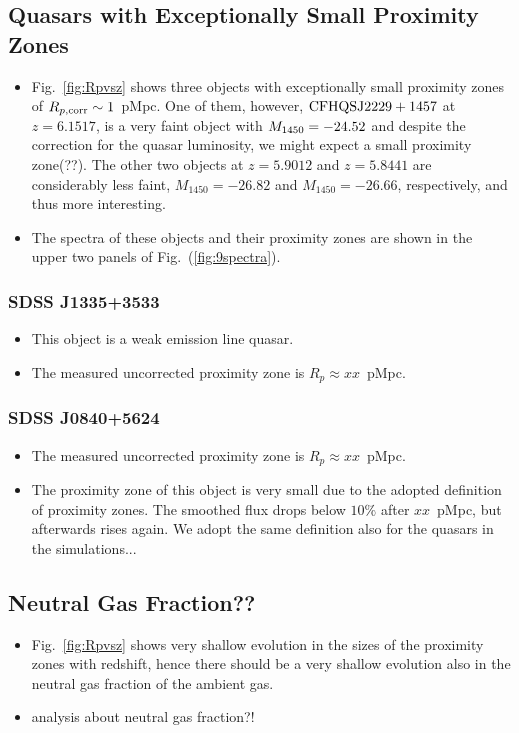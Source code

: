 \documentclass[iop]{emulateapj}
\begin{document}
\subsection{Quasars with Exceptionally Small Proximity Zones}\label{sec:small_zones}

\begin{itemize}
\item Fig.~\ref{fig:Rpvsz} shows three objects with exceptionally small proximity zones of $R_{p, \rm corr}\sim 1$~pMpc. One of them, however, $\rm CFHQS J2229+1457$ at $z=6.1517$, is a very faint object with $M_{\rm 1450}=-24.52$ and despite the correction for the quasar luminosity, we might expect a small proximity zone(??). The other two objects at $z=5.9012$ and $z=5.8441$ are considerably less faint, $M_{1450}=-26.82$ and $M_{1450}=-26.66$, respectively, and thus more interesting. 
\item The spectra of these objects and their proximity zones are shown in the upper two panels of Fig.~(\ref{fig:9spectra}).
\end{itemize}
 
\subsubsection*{SDSS J1335+3533} 
\begin{itemize}
\item This object is a weak emission line quasar. 
\item The measured uncorrected proximity zone is $R_p\approx xx$~pMpc. 
\end{itemize}

\subsubsection*{SDSS J0840+5624} 
\begin{itemize}
\item The measured uncorrected proximity zone is $R_p\approx xx$~pMpc.  
\item The proximity zone of this object is very small due to the adopted definition of proximity zones. The smoothed flux drops below $10\%$ after $xx$~pMpc, but afterwards rises again. We adopt the same definition also for the quasars in the simulations...
\end{itemize}


\subsection{Neutral Gas Fraction??}
\begin{itemize}
\item Fig.~\ref{fig:Rpvsz} shows very shallow evolution in the sizes of the proximity zones with redshift, hence there should be a very shallow evolution also in the neutral gas fraction of the ambient gas. 
\item analysis about neutral gas fraction?!
\end{itemize}
\end{document}

